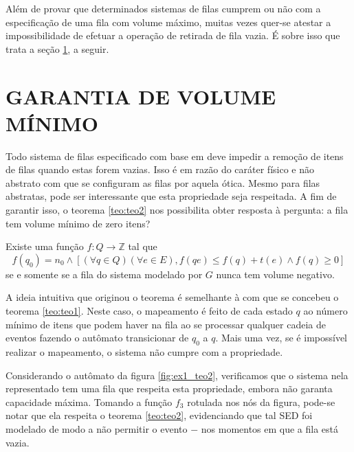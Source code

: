 Além de provar que determinados sistemas de filas cumprem ou não com a especificação de uma fila com volume máximo, muitas vezes quer-se atestar a impossibilidade de efetuar a operação de retirada de fila vazia. É sobre isso que trata a seção \ref{sec:vol_min}, a seguir.

\section{GARANTIA DE VOLUME MÍNIMO}
\label{sec:vol_min}

Todo sistema de filas especificado com base em  deve impedir a remoção de itens de filas quando estas forem vazias. Isso é em razão do caráter físico e não abstrato com que se configuram as filas por aquela ótica. Mesmo para filas abstratas, pode ser interessante que esta propriedade seja respeitada. A fim de garantir isso, o teorema \ref{teo:teo2} nos possibilita obter resposta à pergunta: a fila tem volume mínimo de zero itens?

\begin{teo}
	\label{teo:teo2}
	Existe uma função $f : Q \to \mathbb{Z}$ tal que \begin{equation*}
	f(q_0) = n_0 \wedge [(\forall q \in Q)(\forall e \in E), f(qe) \leq f(q) + t(e) \wedge f(q) \geq 0]
	\end{equation*} se e somente se a fila do sistema modelado por $G$ nunca tem volume negativo.
\end{teo}

A ideia intuitiva que originou o teorema é semelhante à com que se concebeu o teorema \ref{teo:teo1}. Neste caso, o mapeamento é feito de cada estado $q$ ao número mínimo de itens que podem haver na fila ao se processar qualquer cadeia de eventos fazendo o autômato transicionar de $q_0$ a $q$. Mais uma vez, se é impossível realizar o mapeamento, o sistema não cumpre com a propriedade.

Considerando o autômato da figura \ref{fig:ex1_teo2}, verificamos que o sistema nela representado tem uma fila que respeita esta propriedade, embora não garanta capacidade máxima. Tomando a função $f_3$ rotulada nos nós da figura, pode-se notar que ela respeita o teorema \ref{teo:teo2}, evidenciando que tal SED foi modelado de modo a não permitir o evento $-$ nos momentos em que a fila está vazia.


